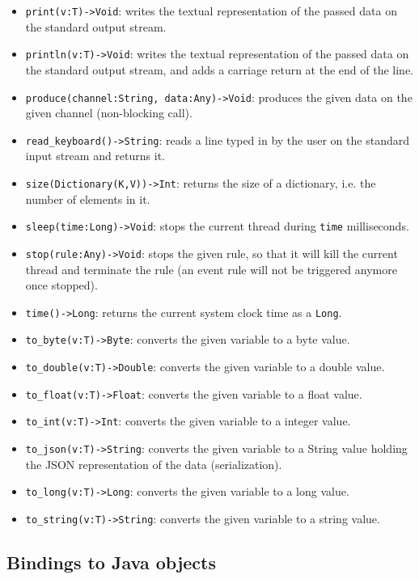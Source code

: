 \documentclass[11pt]{report}
\begin{document}
\begin{itemize}
\item \texttt{print(v:T)->Void}: writes the textual representation of the passed data on the standard output stream.
\item \texttt{println(v:T)->Void}: writes the textual representation of the passed data on the standard output stream, and adds a carriage return at the end of the line.
\item \texttt{produce(channel:String, data:Any)->Void}: produces the given data on the given channel (non-blocking call).
\item \texttt{read\_keyboard()->String}: reads a line typed in by the user on the standard input stream and returns it.
\item \texttt{size(Dictionary(K,V))->Int}: returns the size of a dictionary, i.e. the number of elements in it.
\item \texttt{sleep(time:Long)->Void}: stops the current thread during \texttt{time} milliseconds.
\item \texttt{stop(rule:Any)->Void}: stops the given rule, so that it will kill the current thread and terminate the rule (an event rule will not be triggered anymore once stopped).
\item \texttt{time()->Long}: returns the current system clock time as a \texttt{Long}.
\item \texttt{to\_byte(v:T)->Byte}: converts the given variable to a byte value.
\item \texttt{to\_double(v:T)->Double}: converts the given variable to a double value.
\item \texttt{to\_float(v:T)->Float}: converts the given variable to a float value.
\item \texttt{to\_int(v:T)->Int}: converts the given variable to a integer value.
\item \texttt{to\_json(v:T)->String}: converts the given variable to a String value holding the JSON representation of the data (serialization).
\item \texttt{to\_long(v:T)->Long}: converts the given variable to a long value.
\item \texttt{to\_string(v:T)->String}: converts the given variable to a string value.
\end{itemize}

\subsection{Bindings to Java objects\label{sec:bindings}}
\end{document}
